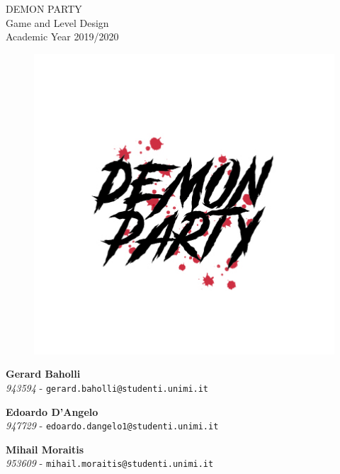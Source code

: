 {	\vspace*{7mm}

	\begin{center}
		\LARGE DEMON PARTY\\
		\vspace*{2mm}
		\Large Game and Level Design\\
		\large Academic Year 2019/2020
	\end{center}

	\newpage

	\begin{figure}[H]
		\centering
		\includegraphics[width=0.8\linewidth]{images/frontespizio/demonparty_logo.jpg}
	\end{figure}

	\vspace*{2mm}

	\begin{center}
		\textbf{Gerard Baholli}\\
		\textit{943594} - \texttt{gerard.baholli@studenti.unimi.it}\\
		
		\vspace*{7mm}
		
		\textbf{Edoardo D'Angelo}\\
		\textit{947729} - \texttt{edoardo.dangelo1@studenti.unimi.it}\\
		
		\vspace*{7mm}
		
		\textbf{Mihail Moraitis}\\
		\textit{953609} - \texttt{mihail.moraitis@studenti.unimi.it}\\
	\end{center}

}